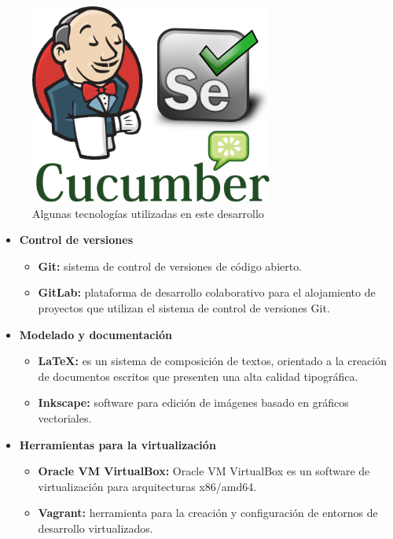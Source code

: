 \begin{figure}[!h]
\centering
   \includegraphics[width=8cm]{Algunas_tecnologias_utilizadas.png}
\caption{Algunas tecnologías utilizadas en este desarrollo}
\end{figure}

\begin{itemize}
\item \textbf{Control de versiones}
\begin{itemize}
\item \textbf{Git:} sistema de control de versiones de código abierto\cite{Git}.
\item \textbf{GitLab:} plataforma de desarrollo colaborativo para el alojamiento de proyectos que utilizan el sistema de control de versiones Git\cite{GitLab}.
\end{itemize}
\end{itemize}

\begin{itemize}
\item \textbf{Modelado y documentación}
\begin{itemize}
\item \textbf{\LaTeX: }es un sistema de composición de textos, orientado a la creación de documentos escritos que presenten una alta calidad tipográfica\cite{LaTeX}.
\item \textbf{Inkscape: }software para edición de imágenes basado en gráficos vectoriales\cite{Inkscape}.
\end{itemize}
\end{itemize}

\begin{itemize}
\item \textbf{Herramientas para la virtualización}
\begin{itemize}
\item \textbf{Oracle VM VirtualBox: }Oracle VM VirtualBox es un software de virtualización para arquitecturas x86/amd64\cite{VirtualBox}.
\end{itemize}
\begin{itemize}
\item \textbf{Vagrant: }herramienta para la creación y configuración de entornos de desarrollo virtualizados\cite{Vagrant}.
\end{itemize}
\end{itemize}

